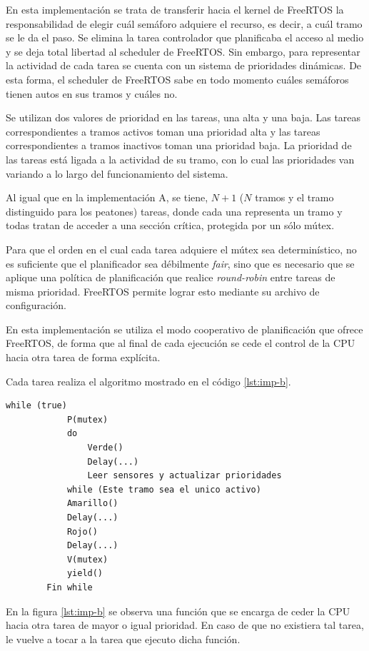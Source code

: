 	En esta implementación se trata de transferir hacia el kernel de FreeRTOS la responsabilidad de elegir cuál semáforo adquiere el recurso, es decir, a cuál tramo se le da el paso.
	Se elimina la tarea controlador que planificaba el acceso al medio y se deja total libertad al scheduler de FreeRTOS.
	Sin embargo, para representar la actividad de cada tarea se cuenta con un sistema de prioridades dinámicas.
	De esta forma, el scheduler de FreeRTOS sabe en todo momento cuáles semáforos tienen autos en sus tramos y cuáles no.

	Se utilizan dos valores de prioridad en las tareas, una alta y una baja.
	Las tareas correspondientes a tramos activos toman una prioridad alta y las tareas correspondientes a tramos inactivos toman una prioridad baja. 
	La prioridad de las tareas está ligada a la actividad de su tramo, con lo cual las prioridades van variando a lo largo del funcionamiento del sistema.

	Al igual que en la implementación A, se tiene, $N + 1$ ($N$ tramos y el tramo distinguido para los peatones) tareas, donde cada una representa un tramo y todas tratan de acceder a una sección crítica, protegida por un sólo mútex.

	Para que el orden en el cual cada tarea adquiere el mútex sea determinístico, no es suficiente que el planificador sea débilmente \emph{fair}, sino que es necesario que se aplique una política de planificación que realice \emph{round-robin} entre tareas de misma prioridad.
	FreeRTOS permite lograr esto mediante su archivo de configuración.

	En esta implementación se utiliza el modo cooperativo de planificación que ofrece FreeRTOS, de forma que al final de cada ejecución se cede el control de la CPU hacia otra tarea de forma explícita.

	Cada tarea realiza el algoritmo mostrado en el código \ref{lst:imp-b}.

	\begin{lstlisting}[float, label=lst:imp-b, caption=Pseudocódigo del programa que corre cada tarea en la implementación B.]
		while (true)
			P(mutex)
			do
				Verde()
				Delay(...)
				Leer sensores y actualizar prioridades
			while (Este tramo sea el unico activo)
			Amarillo()
			Delay(...)
			Rojo()
			Delay(...)
			V(mutex)
			yield()
		Fin while
	\end{lstlisting}

	En la figura \ref{lst:imp-b} se observa una función  que se encarga de ceder la CPU hacia otra tarea de mayor o igual prioridad.
	En caso de que no existiera tal tarea, le vuelve a tocar a la tarea que ejecuto dicha función.


